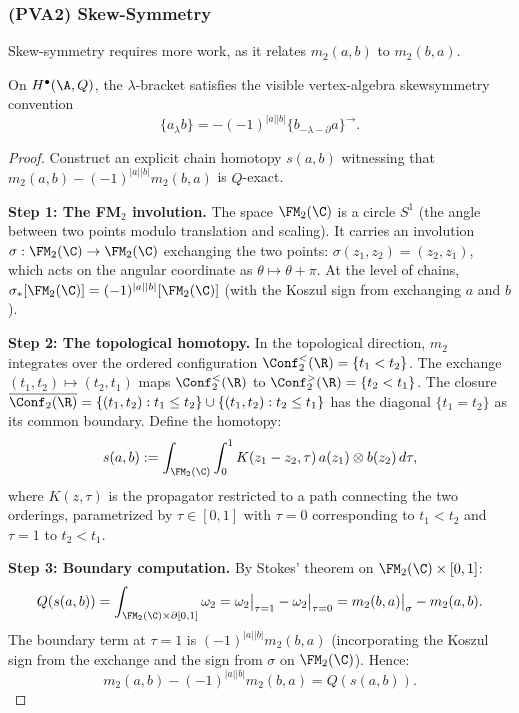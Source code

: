 \subsubsection{(PVA2) Skew-Symmetry}

Skew-symmetry requires more work, as it relates $m_2(a,b)$ to $m_2(b,a)$.

\begin{proposition}
On $H^\bullet(\A,Q)$, the $\lambda$-bracket satisfies the visible
vertex-algebra skewsymmetry convention
\[
\{a_\lambda b\}
= -(-1)^{|a||b|}\{b_{-\lambda-\partial}a\}^{\to}.
\]
\end{proposition}

\begin{proof}
Construct an explicit chain homotopy $s(a,b)$ witnessing that $m_2(a,b) - (-1)^{|a||b|} m_2(b,a)$ is $Q$-exact.

\textbf{Step 1: The FM$_2$ involution.}
The space $\FM_2(\C)$ is a circle $S^1$ (the angle between two points modulo translation and scaling). It carries an involution $\sigma: \FM_2(\C) \to \FM_2(\C)$ exchanging the two points: $\sigma(z_1,z_2) = (z_2,z_1)$, which acts on the angular coordinate as $\theta \mapsto \theta + \pi$. At the level of chains, $\sigma_*[\FM_2(\C)] = (-1)^{|a||b|} [\FM_2(\C)]$ (with the Koszul sign from exchanging $a$ and $b$).

\textbf{Step 2: The topological homotopy.}
In the topological direction, $m_2$ integrates over the ordered configuration $\Conf_2^{<}(\R) = \{t_1 < t_2\}$. The exchange $(t_1, t_2) \mapsto (t_2, t_1)$ maps $\Conf_2^{<}(\R)$ to $\Conf_2^{>}(\R) = \{t_2 < t_1\}$. The closure $\overline{\Conf_2(\R)} = \{(t_1, t_2) : t_1 \le t_2\} \cup \{(t_1, t_2) : t_2 \le t_1\}$ has the diagonal $\{t_1 = t_2\}$ as its common boundary. Define the homotopy:
\[
s(a,b) := \int_{\FM_2(\C)} \int_0^1 K(z_1 - z_2, \tau)\, a(z_1) \otimes b(z_2)\, d\tau,
\]
where $K(z, \tau)$ is the propagator restricted to a path connecting the two orderings, parametrized by $\tau \in [0,1]$ with $\tau = 0$ corresponding to $t_1 < t_2$ and $\tau = 1$ to $t_2 < t_1$.

\textbf{Step 3: Boundary computation.}
By Stokes' theorem on $\FM_2(\C) \times [0,1]$:
\[
Q(s(a,b)) = \int_{\FM_2(\C) \times \partial[0,1]} \omega_2 = \omega_2\big|_{\tau=1} - \omega_2\big|_{\tau=0} = m_2(b,a)\big|_{\sigma} - m_2(a,b).
\]
The boundary term at $\tau = 1$ is $(-1)^{|a||b|} m_2(b,a)$ (incorporating the Koszul sign from the exchange and the sign from $\sigma$ on $\FM_2(\C)$). Hence:
\[
m_2(a,b) - (-1)^{|a||b|} m_2(b,a) = Q(s(a,b)).
\]


\end{proof}
